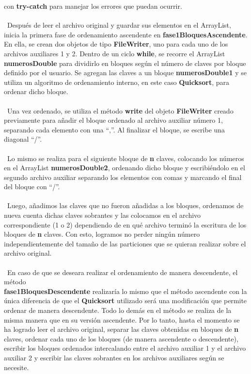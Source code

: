 \documentclass[12pt,letterpaper]{report}
\begin{document}
con \textbf{try-catch} para manejar los errores que puedan ocurrir.\\\\\
Después de leer el archivo original y guardar sus elementos en el ArrayList, inicia la primera fase de ordenamiento ascendente en \textbf{fase1BloquesAscendente}. En ella, se crean dos objetos de tipo \textbf{FileWriter}, uno para cada uno de los archivos auxiliares 1 y 2. Dentro de un ciclo \textbf{while}, se recorre el ArrayList \textbf{numerosDouble} para dividirlo en bloques según el número de claves por bloque definido por el usuario. Se agregan las claves a un bloque \textbf{numerosDouble1} y se utiliza un algoritmo de ordenamiento interno, en este caso \textbf{Quicksort}, para ordenar dicho bloque.\\\\\ Una vez ordenado, se utiliza el método \textbf{write} del objeto \textbf{FileWriter} creado previamente para añadir el bloque ordenado al archivo auxiliar número 1, separando cada elemento con una “,”. Al finalizar el bloque, se escribe una diagonal “/”.\\\\\ Lo mismo se realiza para el siguiente bloque de \textbf{n} claves, colocando los números en el ArrayList \textbf{numerosDouble2}, ordenando dicho bloque y escribiéndolo en el segundo archivo auxiliar separando los elementos con comas y marcando el final del bloque con “/”. \\\\\ Luego, añadimos las claves que no fueron añadidas a los bloques, ordenamos de nueva cuenta dichas claves sobrantes y las colocamos en el archivo correspondiente (1 o 2) dependiendo de en qué archivo terminó la escritura de los bloques de \textbf{n} claves. Con esto, logramos no perder ningún número independientemente del tamaño de las particiones que se quieran realizar sobre el archivo original.\\\\\
En caso de que se deseara realizar el ordenamiento de manera descendente, el método \\ \textbf{fase1BloquesDescendente} realizaría lo mismo que el método ascendente con la única diferencia de que el \textbf{Quicksort} utilizado será una modificación que permite ordenar de manera descendente. Todo lo demás en el método se realiza de la misma manera que en su versión ascendente. Por lo tanto, hasta el momento se ha logrado leer el archivo original, separar las claves obtenidas en bloques de \textbf{n} claves, ordenar cada uno de los bloques (de manera ascendente o descendente), escribir los bloques ordenados intercalando entre el archivo auxiliar 1 y el archivo auxiliar 2 y escribir las claves sobrantes en los archivos auxiliares según se necesite.\\\\\
\end{document}
